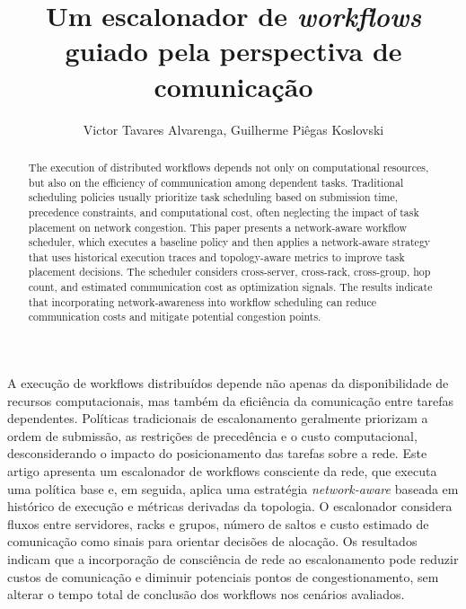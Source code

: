 \documentclass[12pt]{article}
\title{Um escalonador de \textit{workflows} guiado pela perspectiva de comunicação}
\author{Victor Tavares Alvarenga\inst{1}, 
Guilherme Piêgas Koslovski\inst{1}}
\begin{document}
 



\maketitle


\begin{resumo}
A execução de workflows distribuídos depende não apenas da disponibilidade de recursos computacionais, mas também da eficiência da comunicação entre tarefas dependentes. Políticas tradicionais de escalonamento geralmente priorizam a ordem de submissão, as restrições de precedência e o custo computacional, desconsiderando o impacto do posicionamento das tarefas sobre a rede. Este artigo apresenta um escalonador de workflows consciente da rede, que executa uma política base e, em seguida, aplica uma estratégia \textit{network-aware} baseada em histórico de execução e métricas derivadas da topologia. O escalonador considera fluxos entre servidores, racks e grupos, número de saltos e custo estimado de comunicação como sinais para orientar decisões de alocação. Os resultados indicam que a incorporação de consciência de rede ao escalonamento pode reduzir custos de comunicação e diminuir potenciais pontos de congestionamento, sem alterar o tempo total de conclusão dos workflows nos cenários avaliados.
\end{resumo}



\begin{abstract}
The execution of distributed workflows depends not only on computational resources, but also on the efficiency of communication among dependent tasks. Traditional scheduling policies usually prioritize task scheduling based on submission time, precedence constraints, and computational cost, often neglecting the impact of task placement on network congestion.
%
This paper presents a network-aware workflow scheduler, which executes a baseline policy and then applies a network-aware strategy that uses historical execution traces and topology-aware metrics to improve task placement decisions.
%
The scheduler considers cross-server, cross-rack, cross-group, hop count, and estimated communication cost as optimization signals. 
%
The results indicate that incorporating network-awareness into workflow scheduling can reduce communication costs and mitigate potential congestion points.
\end{abstract}

     
\end{document}
